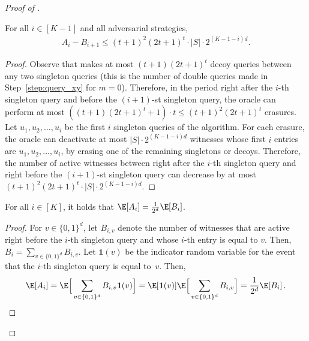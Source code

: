 \documentclass{toc}
\begin{document}
\begin{proof}[Proof of ]
\begin{claim} \label{clm:difference}
For all $i \in [K-1]$ and all adversarial strategies, 
\begin{align*}
    A_i - B_{i+1} \leq (t+1)^2(2t+1)^t \cdot |S| \cdot 2^{(K-1-i)d}.
\end{align*}
\end{claim}
\begin{proof}
Observe that  makes at most $(t+1)(2t+1)^t$ decoy queries between any two singleton queries (this is the number of double queries made in Step~\ref{step:query_xy} for $m=0$).  Therefore, in the period right after the $i$-th singleton query and before the $(i+1)$-st singleton query, the oracle can perform at most $((t+1)(2t+1)^t+1)\cdot t \leq (t+1)^2(2t+1)^t$ erasures. Let $u_1, u_2, \dots, u_i$ be the first $i$ singleton queries of the algorithm. For each erasure, the oracle can deactivate at most $|S|\cdot 2^{(K-1-i)d}$ witnesses whose first $i$ entries are $u_1, u_2, \dots, u_i$, by erasing one of the remaining singletons or decoys. Therefore, the number of active witnesses between right after the $i$-th singleton query and right before the $(i+1)$-st singleton query can decrease by at most $(t+1)^2(2t+1)^t \cdot |S| \cdot 2^{(K-1-i)d}$. 
\end{proof}


\begin{claim} For all $i\in [K]$, it holds that $\E[A_i] = \frac{1}{2^d}\E[B_i]$. 
\label{clm:expectation}
\end{claim}
\begin{proof} For $v \in \{0,1\}^d$, let $B_{i,v}$ denote the number of  witnesses that are active right before the $i$-th singleton query and whose $i$-th entry is equal to $v$. Then, $B_i = \sum_{v \in \{0,1\}^d} B_{i,v}$. Let $\mathbf{1}(v)$ be the indicator random variable for the event that the $i$-th singleton query is equal to~$v$. Then,  
\[
    \E[A_i] =   \E\Big[\sum_{v \in \{0,1\}^d} B_{i,v}\mathbf{1}(v)\Big]
    = \E[\mathbf{1}(v)]\E\Big[\sum_{v \in \{0,1\}^d} B_{i,v}\Big] 
    = \frac{1}{2^d}\E[B_i]\,. 
%
    \qedhere
\]
\end{proof}


\end{proof}
\end{document}

